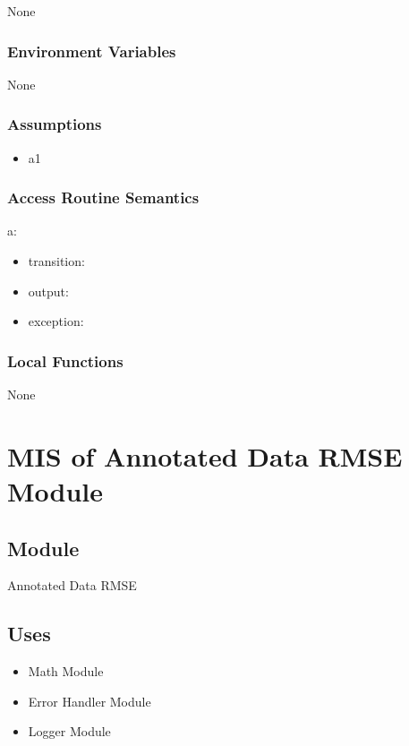 \documentclass[12pt, titlepage]{article}
\begin{document}
None

\subsubsection{Environment Variables}

None

\subsubsection{Assumptions}

\begin{itemize}
\item a1
\end{itemize}

\subsubsection{Access Routine Semantics}

\noindent a:
\begin{itemize}
\item transition: 
\item output: 
\item exception: 
\end{itemize}

\subsubsection{Local Functions}

None

\newpage

\section{MIS of Annotated Data RMSE Module} \label{MIS_RMSE}

\subsection{Module}

Annotated Data RMSE

\subsection{Uses}

\begin{itemize}
\item Math Module
\item Error Handler Module
\item Logger Module
\end{itemize}
\end{document}
